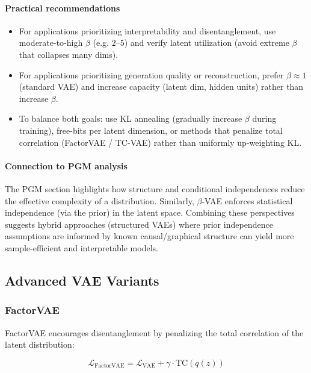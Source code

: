\documentclass[conference]{IEEEtran}
\begin{document}
\paragraph{Practical recommendations}
\begin{itemize}
    \item For applications prioritizing interpretability and disentanglement, use moderate-to-high $\beta$ (e.g. $2$--$5$) and verify latent utilization (avoid extreme $\beta$ that collapses many dims).
    \item For applications prioritizing generation quality or reconstruction, prefer $\beta \approx 1$ (standard VAE) and increase capacity (latent dim, hidden units) rather than increase $\beta$.
    \item To balance both goals: use KL annealing (gradually increase $\beta$ during training), free-bits per latent dimension, or methods that penalize total correlation (FactorVAE / TC-VAE) rather than uniformly up-weighting KL.
\end{itemize}

\paragraph{Connection to PGM analysis}
The PGM section highlights how structure and conditional independences reduce the effective complexity of a distribution. Similarly, $\beta$-VAE enforces statistical independence (via the prior) in the latent space. Combining these perspectives suggests hybrid approaches (structured VAEs) where prior independence assumptions are informed by known causal/graphical structure can yield more sample-efficient and interpretable models.


\subsection{Advanced VAE Variants}

\subsubsection{FactorVAE}

FactorVAE encourages disentanglement by penalizing the total correlation of the latent distribution:

\begin{equation}
\mathcal{L}_{\text{FactorVAE}} = \mathcal{L}_{\text{VAE}} + \gamma \cdot \text{TC}(q(z))
\end{equation}
\end{document}

